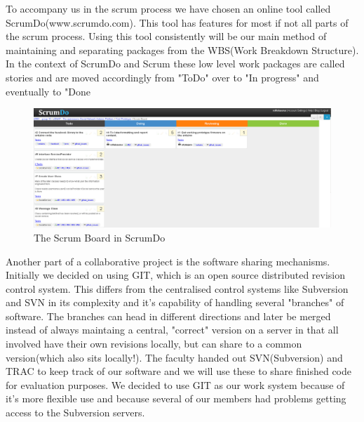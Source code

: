 To accompany us in the scrum process we have chosen an online tool called ScrumDo(www.scrumdo.com). This tool has features for most if not all parts of the scrum process. Using this tool consistently will be our main method of maintaining and separating packages from the WBS(Work Breakdown Structure). In the context of ScrumDo and Scrum these low level work packages are called stories and are moved accordingly from "ToDo" over to "In progress" and eventually to "Done

\begin{figure}
	\centering
	\includegraphics{./img/management-scrumdo.png}
	\caption{The Scrum Board in ScrumDo}
	\label{fig:management-scrumdo}
\end{figure}


Another part of a collaborative project is the software sharing mechanisms. Initially we decided on using GIT, which is an open source distributed revision control system. This differs from the centralised control systems like Subversion and SVN in its complexity and it's capability of handling several "branches" of software. The branches can head in different directions and later be merged instead of always maintaing a central, "correct" version on a server in that all involved have their own revisions locally, but can share to a common version(which also sits locally!). The faculty handed out SVN(Subversion) and TRAC to keep track of our software and we will use these to share finished code for evaluation purposes. We decided to use GIT as our work system because of it's more flexible use and because several of our members had problems getting access to the Subversion servers. 





